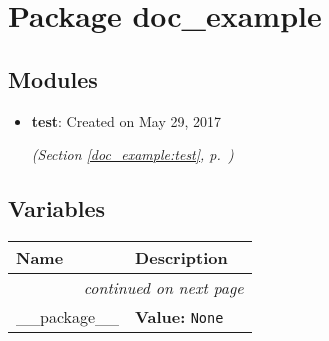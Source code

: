 %
%
%


\section{Package doc\_example}

    \label{doc_example}


\subsection{Modules}

\begin{itemize}
\setlength{\parskip}{0ex}
\item \textbf{test}: Created on May 29, 2017



  \textit{(Section \ref{doc_example:test}, p.~\pageref{doc_example:test})}

\end{itemize}



  \subsection{Variables}

    \vspace{-1cm}
\hspace{\varindent}\begin{longtable}{|p{\varnamewidth}|p{\vardescrwidth}|l}
\cline{1-2}
\cline{1-2} \centering \textbf{Name} & \centering \textbf{Description}& \\
\cline{1-2}
\endhead\cline{1-2}\multicolumn{3}{r}{\small\textit{continued on next page}}\\\endfoot\cline{1-2}
\endlastfoot\raggedright \_\-\_\-p\-a\-c\-k\-a\-g\-e\-\_\-\_\- & \raggedright \textbf{Value:} 
{\tt None}&\\
\cline{1-2}
\end{longtable}

